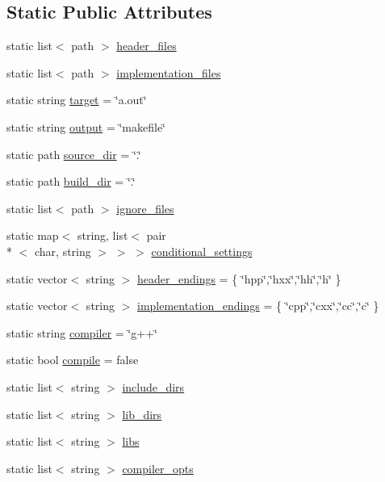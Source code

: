 \subsection*{Static Public Attributes}
\begin{DoxyCompactItemize}
\item 
static list$<$ path $>$ \hyperlink{structsettings_ab910724468ff0119dcb5fec1399eac9f}{header\-\_\-files}
\item 
static list$<$ path $>$ \hyperlink{structsettings_aca3dbe12e7356fd1470e358838053b11}{implementation\-\_\-files}
\item 
static string \hyperlink{structsettings_a9f3ce046370466aa963ce6096b6fcacd}{target} = \char`\"{}a.\-out\char`\"{}
\item 
static string \hyperlink{structsettings_a0ee03de4526f2243b1a8fccfe99021fc}{output} = \char`\"{}makefile\char`\"{}
\item 
static path \hyperlink{structsettings_a60c9f664edda432102c9975131edfa1e}{source\-\_\-dir} = \char`\"{}.\char`\"{}
\item 
static path \hyperlink{structsettings_a900e5b234e36b0395feb215cd807bdac}{build\-\_\-dir} = \char`\"{}.\char`\"{}
\item 
static list$<$ path $>$ \hyperlink{structsettings_aff7f8f80b30749135c089741a4e07b0c}{ignore\-\_\-files}
\item 
static map$<$ string, list$<$ pair\\*
$<$ char, string $>$ $>$ $>$ \hyperlink{structsettings_ac27735f1d33fb886c326a795d4368994}{conditional\-\_\-settings}
\item 
static vector$<$ string $>$ \hyperlink{structsettings_a041d015d89dc53beca67ff8171e4eebb}{header\-\_\-endings} = \{ \char`\"{}hpp\char`\"{},\char`\"{}hxx\char`\"{},\char`\"{}hh\char`\"{},\char`\"{}h\char`\"{} \}
\item 
static vector$<$ string $>$ \hyperlink{structsettings_af86d24c31f2f22f2d4bb588b901b06f7}{implementation\-\_\-endings} = \{ \char`\"{}cpp\char`\"{},\char`\"{}cxx\char`\"{},\char`\"{}cc\char`\"{},\char`\"{}c\char`\"{} \}
\item 
static string \hyperlink{structsettings_a208883e6fc65f3abafbfec8ca0d4989d}{compiler} = \char`\"{}g++\char`\"{}
\item 
static bool \hyperlink{structsettings_a575bd5aad5894fe2b1a9c110506c4a0a}{compile} = false
\item 
static list$<$ string $>$ \hyperlink{structsettings_a08e64a4b8389d43ddb5ac80a9c38b972}{include\-\_\-dirs}
\item 
static list$<$ string $>$ \hyperlink{structsettings_ad610e1e631ff18ec593a47b6c73e6a4f}{lib\-\_\-dirs}
\item 
static list$<$ string $>$ \hyperlink{structsettings_a7c19b7fd03fe16661f946dbfc1417cb4}{libs}
\item 
static list$<$ string $>$ \hyperlink{structsettings_a5b9460853aa54ea3e48db46744122d54}{compiler\-\_\-opts}
\end{DoxyCompactItemize}



